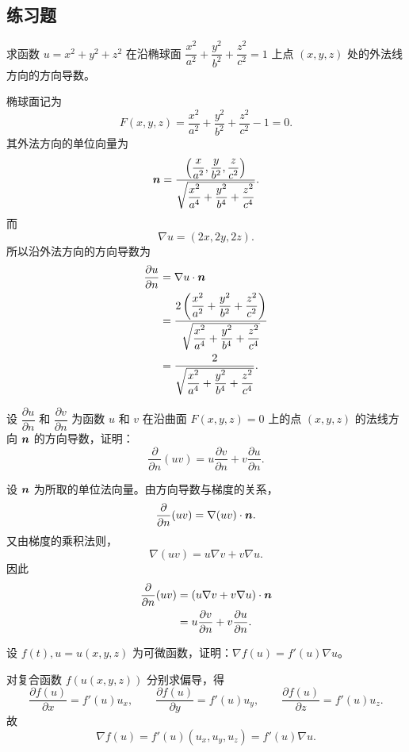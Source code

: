 \subsection{练习题}
\begin{xexercise}[1]
求函数 $u=x^2+y^2+z^2$ 在沿椭球面 $\dfrac{x^2}{a^2}+\dfrac{y^2}{b^2}+\dfrac{z^2}{c^2}=1$ 上点 $(x,y,z)$ 处的外法线方向的方向导数。
\end{xexercise}
\begin{xsolution}
椭球面记为
\[
  F(x,y,z)=\frac{x^2}{a^2}+\frac{y^2}{b^2}+\frac{z^2}{c^2}-1=0.
\]
其外法方向的单位向量为
\[
  \bm{n}=
  \frac{\left(\dfrac{x}{a^2},\dfrac{y}{b^2},\dfrac{z}{c^2}\right)}
  {\sqrt{\dfrac{x^2}{a^4}+\dfrac{y^2}{b^4}+\dfrac{z^2}{c^4}}}.
\]
而
\[
  \nabla u=(2x,2y,2z).
\]
所以沿外法方向的方向导数为
\[
\begin{aligned}
  \frac{\partial u}{\partial n}
  &=\nabla u\cdot\bm{n}\\
  &=\frac{2\left(\dfrac{x^2}{a^2}+\dfrac{y^2}{b^2}+\dfrac{z^2}{c^2}\right)}
  {\sqrt{\dfrac{x^2}{a^4}+\dfrac{y^2}{b^4}+\dfrac{z^2}{c^4}}}\\
  &=\frac{2}{\sqrt{\dfrac{x^2}{a^4}+\dfrac{y^2}{b^4}+\dfrac{z^2}{c^4}}}.
\end{aligned}
\]
\end{xsolution}


\begin{xexercise}[2]
设 $\dfrac{\partial u}{\partial n}$ 和 $\dfrac{\partial v}{\partial n}$ 为函数 $u$ 和 $v$ 在沿曲面 $F(x,y,z)=0$ 上的点 $(x,y,z)$ 的法线方向 $\bm{n}$ 的方向导数，证明：
  \[
    \frac{\partial}{\partial n}(uv)=u\frac{\partial v}{\partial n}+v\frac{\partial u}{\partial n}.
  \]
\end{xexercise}
\begin{xsolution}
设 $\bm{n}$ 为所取的单位法向量。由方向导数与梯度的关系，
\[
  \frac{\partial}{\partial n}(uv)
  =\nabla(uv)\cdot\bm{n}.
\]
又由梯度的乘积法则，
\[
  \nabla(uv)=u\nabla v+v\nabla u.
\]
因此
\[
\begin{aligned}
  \frac{\partial}{\partial n}(uv)
  &=(u\nabla v+v\nabla u)\cdot\bm{n}\\
  &=u\frac{\partial v}{\partial n}
  +v\frac{\partial u}{\partial n}.
\end{aligned}
\]
\end{xsolution}


\begin{xexercise}[3]
设 $f(t),u=u(x,y,z)$ 为可微函数，证明：$\nabla f(u)=f'(u)\nabla u$。
\end{xexercise}
\begin{xsolution}
对复合函数 $f(u(x,y,z))$ 分别求偏导，得
\[
  \frac{\partial f(u)}{\partial x}=f'(u)u_x,
  \qquad
  \frac{\partial f(u)}{\partial y}=f'(u)u_y,
  \qquad
  \frac{\partial f(u)}{\partial z}=f'(u)u_z.
\]
故
\[
  \nabla f(u)
  =f'(u)(u_x,u_y,u_z)
  =f'(u)\nabla u.
\]
\end{xsolution}


